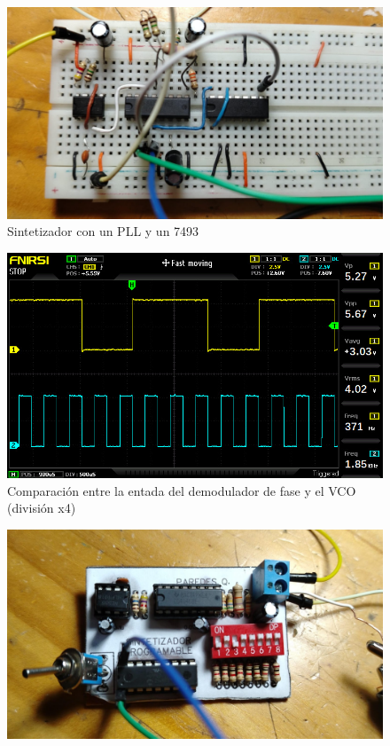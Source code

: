 \begin{enumerate} [label={\alph*.}]
    \begin{figure}[H]
        \centering
        \includegraphics[width=.9\textwidth]{imgs/5.2. CIrucito.jpg}
        \caption{Sintetizador con un PLL y un 7493}
    \end{figure}
    \begin{figure}[H]
        \centering
        \includegraphics[width=.9\textwidth]{imgs/5.2. Salida del circuito.jpg}
        \caption{Comparación entre la entada del demodulador de fase y el VCO (división x4)}
    \end{figure}
    \newpage
    \begin{figure}[H]
        \centering
        \includegraphics[width=.9\textwidth]{imgs/5.2. Cirucito con PIC.jpg}

\end{figure}
\end{enumerate}
